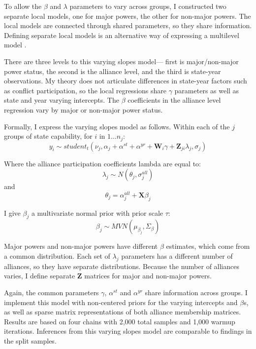 \documentclass[12pt]{article}
\begin{document}
To allow the $\beta$ and $\lambda$ parameters to vary across groups, I constructed two separate local models, one for major powers, the other for non-major powers. 
The local models are connected through shared parameters, so they share information.
Defining separate local models is an alternative way of expressing a multilevel model \citet[pg. 263]{GelmanHill2007}. 


There are three levels to this varying slopes model--- first is major/non-major power status, the second is the alliance level, and the third is state-year observations. 
My theory does not articulate differences in state-year factors such as conflict participation, so the local regressions share $\gamma$ parameters as well as state and year varying intercepts. 
The $\beta$ coefficients in the alliance level regression vary by major or non-major power status. 


Formally, I express the varying slopes model as follows. 
Within each of the $j$ groups of state capability, for $i$ in $1 ... n_j$: 
\begin{equation}
y_i \sim student_t(\nu_j, \alpha_j + \alpha^{st} + \alpha^{yr} +\textbf{W}_{i} \gamma  + \textbf{Z}_{ji} \lambda_{j}, \sigma_j) 
\end{equation} 

Where the alliance participation coefficients lambda are equal to:
\begin{equation}
\lambda_{j} \sim N(\theta_{j}, \sigma^{all}_{j})
\end{equation} 
and 
\begin{equation}
\theta_{j} = \alpha^{all}_{j} + \textbf{X} \beta_j
\end{equation}


I give $\beta_j$ a multivariate normal prior with prior scale $\tau$:
\begin{equation}
\beta_j \sim MVN(\mu_{\beta_j}, \Sigma_{\beta}) 
\end{equation}

 
Major powers and non-major powers have different $\beta$ estimates, which come from a common distribution. 
Each set of $\lambda_j$ parameters has a different number of alliances, so they have separate distributions. 
Because the number of alliances varies, I define separate \textbf{Z} matrices for major and non-major powers. 


Again, the common parameters $\gamma$, $\alpha^{st}$ and $\alpha^{yr}$ share information across groups. 
I implement this model with non-centered priors for the varying intercepts and $\beta$s, as well as sparse matrix representations of both alliance membership matrices. 
Results are based on four chains with 2,000 total samples and 1,000 warmup iterations. 
Inferences from this varying slopes model are comparable to findings in the split samples. 
\end{document}
